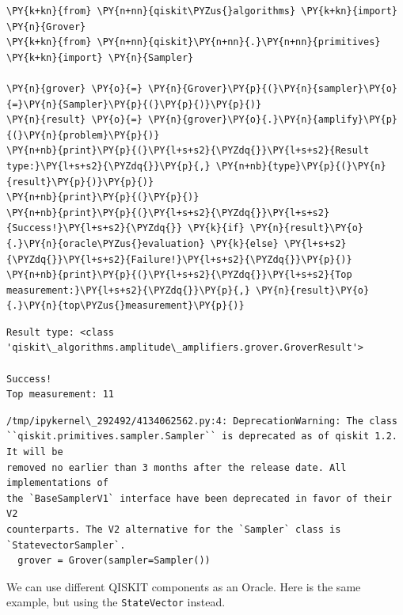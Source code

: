     \begin{tcolorbox}[breakable, size=fbox, boxrule=1pt, pad at break*=1mm,colback=cellbackground, colframe=cellborder]
\begin{Verbatim}[commandchars=\\\{\}]
\PY{k+kn}{from} \PY{n+nn}{qiskit\PYZus{}algorithms} \PY{k+kn}{import} \PY{n}{Grover}
\PY{k+kn}{from} \PY{n+nn}{qiskit}\PY{n+nn}{.}\PY{n+nn}{primitives} \PY{k+kn}{import} \PY{n}{Sampler}

\PY{n}{grover} \PY{o}{=} \PY{n}{Grover}\PY{p}{(}\PY{n}{sampler}\PY{o}{=}\PY{n}{Sampler}\PY{p}{(}\PY{p}{)}\PY{p}{)}
\PY{n}{result} \PY{o}{=} \PY{n}{grover}\PY{o}{.}\PY{n}{amplify}\PY{p}{(}\PY{n}{problem}\PY{p}{)}
\PY{n+nb}{print}\PY{p}{(}\PY{l+s+s2}{\PYZdq{}}\PY{l+s+s2}{Result type:}\PY{l+s+s2}{\PYZdq{}}\PY{p}{,} \PY{n+nb}{type}\PY{p}{(}\PY{n}{result}\PY{p}{)}\PY{p}{)}
\PY{n+nb}{print}\PY{p}{(}\PY{p}{)}
\PY{n+nb}{print}\PY{p}{(}\PY{l+s+s2}{\PYZdq{}}\PY{l+s+s2}{Success!}\PY{l+s+s2}{\PYZdq{}} \PY{k}{if} \PY{n}{result}\PY{o}{.}\PY{n}{oracle\PYZus{}evaluation} \PY{k}{else} \PY{l+s+s2}{\PYZdq{}}\PY{l+s+s2}{Failure!}\PY{l+s+s2}{\PYZdq{}}\PY{p}{)}
\PY{n+nb}{print}\PY{p}{(}\PY{l+s+s2}{\PYZdq{}}\PY{l+s+s2}{Top measurement:}\PY{l+s+s2}{\PYZdq{}}\PY{p}{,} \PY{n}{result}\PY{o}{.}\PY{n}{top\PYZus{}measurement}\PY{p}{)}
\end{Verbatim}
\end{tcolorbox}

    \begin{Verbatim}[commandchars=\\\{\}]
Result type: <class
'qiskit\_algorithms.amplitude\_amplifiers.grover.GroverResult'>

Success!
Top measurement: 11
    \end{Verbatim}

    \begin{Verbatim}[commandchars=\\\{\}]
/tmp/ipykernel\_292492/4134062562.py:4: DeprecationWarning: The class
``qiskit.primitives.sampler.Sampler`` is deprecated as of qiskit 1.2. It will be
removed no earlier than 3 months after the release date. All implementations of
the `BaseSamplerV1` interface have been deprecated in favor of their V2
counterparts. The V2 alternative for the `Sampler` class is
`StatevectorSampler`.
  grover = Grover(sampler=Sampler())
    \end{Verbatim}

    We can use different QISKIT components as an Oracle. Here is the same
example, but using the \texttt{StateVector} instead.

